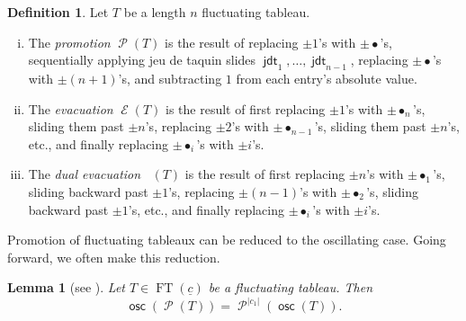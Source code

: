 \documentclass{amsart}
\newtheorem{lemma}[theorem]{Lemma}
\theoremstyle{definition}
\newtheorem{definition}[theorem]{Definition}
\theoremstyle{remark}
\numberwithin{equation}{section}
\DeclareMathOperator{\osc}{\mathsf{osc}}
\DeclareMathOperator{\ft}{FT}
\DeclareMathOperator{\promotion}{\mathcal{P}}
\DeclareMathOperator{\devacuation}{\mathcal{E}^*}
\DeclareMathOperator{\evacuation}{\mathcal{E}}
\DeclareMathOperator{\JDT}{\mathsf{jdt}}
\begin{document}
\begin{definition}
  Let $T$ be a length $n$ fluctuating tableau.
  \begin{enumerate}[(i)]
    \item The \emph{promotion} $\promotion(T)$ is the result of replacing $\pm 1$'s with $\pm \bullet$'s, sequentially applying jeu de taquin slides $\JDT_1, \dots, \JDT_{n-1}$, replacing $\pm \bullet$'s with $\pm (n+1)$'s, and subtracting $1$ from each entry's absolute value.
    \item The \emph{evacuation} $\evacuation(T)$ is the result of first replacing $\pm 1$'s with $\pm \bullet_n$'s, sliding them past $\pm n$'s, replacing $\pm 2$'s with $\pm \bullet_{n-1}$'s, sliding them past $\pm n$'s, etc., and finally replacing $\pm \bullet_i$'s with $\pm i$'s.
    \item The \emph{dual evacuation} $\devacuation(T)$ is the result of first replacing $\pm n$'s with $\pm \bullet_1$'s, sliding backward past $\pm 1$'s, replacing $\pm (n-1)$'s with $\pm \bullet_2$'s, sliding backward past $\pm 1$'s, etc., and finally replacing $\pm \bullet_i$'s with $\pm i$'s.
  \end{enumerate}
\end{definition}

Promotion of fluctuating tableaux can be reduced to the oscillating case. Going forward, we often make this reduction.

\begin{lemma}[see {\cite[Lem.~4.16]{fluctuating-paper}}]
\label{lem:prom-of-osc}
    Let $T \in \ft(\underline{c})$ be a fluctuating tableau. Then
    \[
    \osc(\promotion(T)) = \promotion^{|c_1|} ( \osc(T)).
    \]
\end{lemma}
\end{document}
